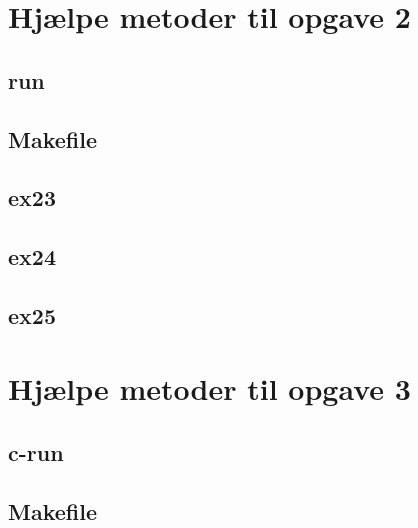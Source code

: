 \documentclass[danish,a4paper]{report}
\begin{document}
\appendix
\chapter{Hjælpe metoder til opgave 2}
\section*{run}

\section*{Makefile}

\section*{ex23}

\section*{ex24}

\section*{ex25}


\chapter{Hjælpe metoder til opgave 3}
\section*{c-run}

\section*{Makefile}

\label{LastPage}
\end{document}
